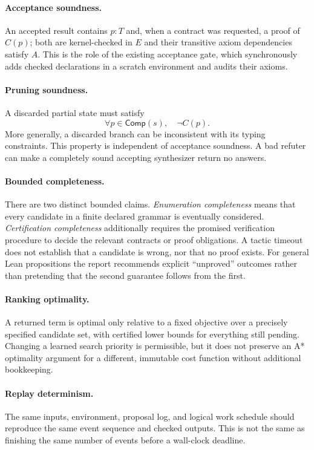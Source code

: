 \documentclass[11pt,a4paper]{article}
\newcommand{\Comp}{\mathsf{Comp}}
\theoremstyle{remark}
\begin{document}
\paragraph{Acceptance soundness.}
An accepted result contains $p:T$ and, when a contract was requested, a proof
of $C(p)$; both are kernel-checked in $E$ and their transitive axiom
dependencies satisfy $A$. This is the role of the existing acceptance gate,
which synchronously adds checked declarations in a scratch environment and
audits their axioms.\cite{leantgate}

\paragraph{Pruning soundness.}
A discarded partial state must satisfy
\begin{equation}\label{eq:prune}
 \forall p\in\Comp(s),\quad \neg C(p).
\end{equation}
More generally, a discarded branch can be inconsistent with its typing
constraints. This property is independent of acceptance soundness. A bad
refuter can make a completely sound accepting synthesizer return no answers.

\paragraph{Bounded completeness.}
There are two distinct bounded claims. \emph{Enumeration completeness} means
that every candidate in a finite declared grammar is eventually considered.
\emph{Certification completeness} additionally requires the promised
verification procedure to decide the relevant contracts or proof obligations.
A tactic timeout does not establish that a candidate is wrong, nor that no
proof exists. For general Lean propositions the report recommends explicit
``unproved'' outcomes rather than pretending that the second guarantee
follows from the first.

\paragraph{Ranking optimality.}
A returned term is optimal only relative to a fixed objective over a precisely
specified candidate set, with certified lower bounds for everything still
pending. Changing a learned search priority is permissible, but it does not
preserve an A* optimality argument for a different, immutable cost function
without additional bookkeeping.

\paragraph{Replay determinism.}
The same inputs, environment, proposal log, and logical work schedule should
reproduce the same event sequence and checked outputs. This is not the same
as finishing the same number of events before a wall-clock deadline.
\end{document}

